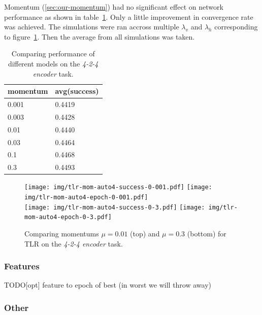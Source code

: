 Momentum (\ref{sec:our-momentum}) had no significant effect on network performance as shown in table~\ref{tab:results-mom-auto4}. Only a little improvement in convergence rate was achieved. The simulations were ran accross multiple $\lambda_v$ and $\lambda_h$ corresponding to figure~\ref{fig:results-tlr-auto4-momentum}. Then the average from all simulations was taken. 
\begin{table}[H] 
  \centering
  {\small
    \begin{tabular}{|l|l|}
    \hline
momentum & avg(success) \\
    \hline
0.001  & 0.4419 \\
    \hline
0.003  & 0.4428 \\
    \hline
0.01   & 0.4440 \\
    \hline
0.03   & 0.4464 \\
    \hline
0.1    & 0.4468 \\
    \hline
0.3    & 0.4493 \\
    \hline
    \end{tabular}
  }
  \caption{Comparing performance of different models on the \emph{4-2-4 encoder} task.} 
  \label{tab:results-mom-auto4}
\end{table}


\begin{figure}[H]
  \centering
  \texttt{[image: img/tlr-mom-auto4-success-0-001.pdf]}  
  \texttt{[image: img/tlr-mom-auto4-epoch-0-001.pdf]}  \\
  \texttt{[image: img/tlr-mom-auto4-success-0-3.pdf]}  
  \texttt{[image: img/tlr-mom-auto4-epoch-0-3.pdf]}  
   \caption{Comparing momentums $\mu=0.01$ (top) and $\mu=0.3$ (bottom) for TLR on the \emph{4-2-4 encoder} task.}
  \label{fig:results-tlr-auto4-momentum}
\end{figure}


\subsubsection{Features}

\label{sec:results-auto4-bal-matrix-sim}
\label{fig:results-candidates-dist-h-fb} 
TODO[opt] feature to epoch of best (in worst we will throw away) 

\subsubsection{Other} 

